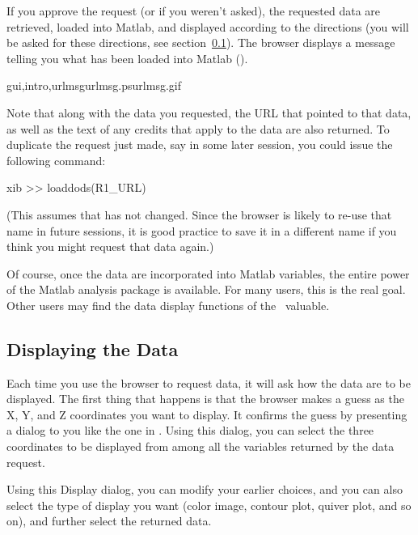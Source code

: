 
If you approve the request (or if you weren't asked), the requested
data are retrieved, loaded into Matlab, and displayed according to the
directions (you will be asked for these directions, see
section~\ref{mgui,data-disp}).  The browser displays a message telling
you what has been loaded into Matlab ().

{gui,intro,urlmsg}{urlmsg.ps}{urlmsg.gif}{}

Note that along with the data you requested, the URL that pointed to
that data, as well as the text of any credits that apply to   the data are
also returned.  To duplicate the request just made, say in some later
session, you could issue the following command:

\begin{vcode}{xib}
>> loaddods(R1_URL)
\end{vcode}

(This assumes that  has not changed.  Since the browser
is likely to re-use that name in future sessions, it is good practice
to save it in a different name if you think you might request that
data again.)

Of course, once the data are incorporated into Matlab variables, the
entire power of the Matlab analysis package is available.  For many
users, this is the real goal.  Other users may find the data display
functions of the \GUI\ valuable.


\subsection{Displaying the Data}
\label{mgui,data-disp}

Each time you use the browser to request data, it will ask how the
data are to be displayed.  The first thing that happens is that the
browser makes a guess as the X, Y, and Z coordinates you want to
display.  It confirms the guess by presenting a dialog to you
  like the one in
.  Using this dialog, you can select the
three coordinates to be displayed from among all the variables
returned by the data request.

Using this Display dialog, you can modify your earlier choices, and
you can also select the type of display you want (color image, contour
plot, quiver plot, and so on), and further select the returned data.

